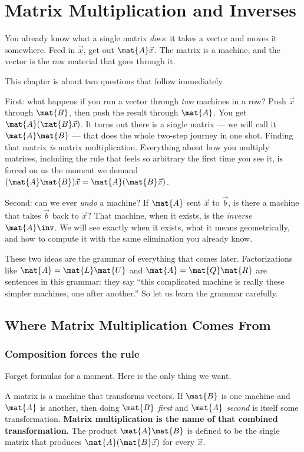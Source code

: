\chapter{Matrix Multiplication and Inverses}

You already know what a single matrix \emph{does}: it takes a vector and moves it
somewhere. Feed in $\vec{x}$, get out $\mat{A}\vec{x}$. The matrix is a machine, and
the vector is the raw material that goes through it.

This chapter is about two questions that follow immediately.

First: what happens if you run a vector through \emph{two} machines in a row? Push
$\vec{x}$ through $\mat{B}$, then push the result through $\mat{A}$. You get
$\mat{A}(\mat{B}\vec{x})$. It turns out there is a single matrix --- we will call it
$\mat{A}\mat{B}$ --- that does the whole two-step journey in one shot. Finding that
matrix \emph{is} matrix multiplication. Everything about how you multiply matrices,
including the rule that feels so arbitrary the first time you see it, is forced on us
the moment we demand $(\mat{A}\mat{B})\vec{x} = \mat{A}(\mat{B}\vec{x})$.

Second: can we ever \emph{undo} a machine? If $\mat{A}$ sent $\vec{x}$ to $\vec{b}$,
is there a machine that takes $\vec{b}$ back to $\vec{x}$? That machine, when it exists,
is the \emph{inverse} $\mat{A}\inv$. We will see exactly when it exists, what it means
geometrically, and how to compute it with the same elimination you already know.

These two ideas are the grammar of everything that comes later. Factorizations like
$\mat{A}=\mat{L}\mat{U}$ and $\mat{A}=\mat{Q}\mat{R}$ are sentences in this grammar:
they say ``this complicated machine is really these simpler machines, one after another.''
So let us learn the grammar carefully.

\section{Where Matrix Multiplication Comes From}
\label{ch08:origin}

\subsection{Composition forces the rule}

Forget formulas for a moment. Here is the only thing we want.

\begin{intuitionbox}
A matrix is a machine that transforms vectors. If $\mat{B}$ is one machine and
$\mat{A}$ is another, then doing $\mat{B}$ \emph{first} and $\mat{A}$ \emph{second}
is itself some transformation. \textbf{Matrix multiplication is the name of that
combined transformation.} The product $\mat{A}\mat{B}$ is defined to be the single
matrix that produces $\mat{A}(\mat{B}\vec{x})$ for every $\vec{x}$.
\end{intuitionbox}

